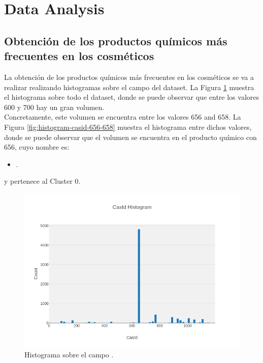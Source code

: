 
\section{Data Analysis}





\subsection{Obtención de los productos químicos más frecuentes en los cosméticos}
\label{sec:casid-histograms}

La obtención de los productos químicos más frecuentes en los cosméticos se va a realizar realizando histogramas sobre el campo  del dataset. La Figura \ref{fig:histogram-casid-basic} muestra el histograma sobre todo el dataset, donde se puede observar que entre los valores 600 y 700 hay un gran volumen. \\

Concretamente, este volumen se encuentra entre los valores 656 and 658. La Figura \ref{fig:histogram-casid-656-658} muestra el histograma entre dichos valores, donde se puede observar que el volumen se encuentra en el producto químico con  656, cuyo nombre es: 
\begin{itemize}
 \item {}.
\end{itemize}

y pertenece al Cluster 0. 

\newpage
\begin{figure}[!th]
\includegraphics[scale=0.5]{figures/histogram-casid-basic}
\centering
\caption{Histograma sobre el campo .}
\label{fig:histogram-casid-basic}
\end{figure}


